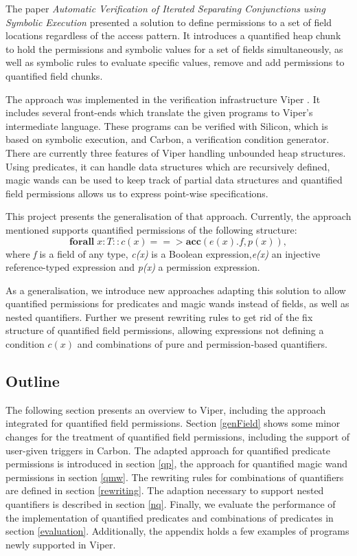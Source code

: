 \documentclass[12pt]{article}
\begin{document}
The paper \textit{Automatic Verification of Iterated Separating Conjunctions using Symbolic Execution} \cite{isc} presented a solution to define permissions to a set of field locations regardless of the access pattern. It introduces a quantified heap chunk to hold the permissions and symbolic values for a set of fields simultaneously, as well as symbolic rules to evaluate specific values, remove and add permissions to quantified field chunks.

The approach was implemented in the verification infrastructure Viper \cite{viper}. It includes several front-ends which translate the given programs to Viper's intermediate language. These programs can be verified with Silicon, which is based on symbolic execution, and Carbon, a verification condition generator. There are currently three features of Viper handling unbounded heap structures. Using predicates, it can handle data structures which are recursively defined, magic wands \cite{magicwand} can be used to keep track of partial data structures and quantified field permissions \cite{isc} allows us to express point-wise specifications. 

This project presents the generalisation of that approach. Currently, the approach mentioned supports quantified permissions of the following structure:
\begin{equation}
	\mathbf{forall} \; x:T :: c(x) ==>\mathbf{acc}( e(x).f, p(x) ) ,
\end{equation}
where {\it f} is a field of any type, {\it c(x)} is  a Boolean expression,{\it e(x)} an injective reference-typed expression and {\it p(x)} a permission expression.

As a generalisation, we introduce new approaches adapting this solution to allow quantified permissions for predicates \cite{predicates} and magic wands \cite{magicwand} instead of fields, as well as  nested quantifiers. Further we present rewriting rules to get rid of the fix structure of quantified field permissions, allowing expressions not defining a condition \(c(x)\) and combinations of pure and permission-based quantifiers.

\subsection{Outline}

The following section presents an overview to Viper, including the approach integrated for quantified field permissions. Section \ref{genField} shows some minor changes for the treatment of quantified field permissions, including the support of user-given triggers in Carbon. The adapted approach for quantified predicate permissions is introduced in section \ref{qp}, the approach for quantified magic wand permissions in section \ref{qmw}. The rewriting rules for combinations of quantifiers are defined in section \ref{rewriting}. The adaption necessary to support nested quantifiers is described in section \ref{nq}. Finally, we evaluate the performance of the implementation of quantified predicates and combinations of predicates in section \ref{evaluation}. Additionally, the appendix holds a few examples of programs newly supported in Viper.
\end{document}
